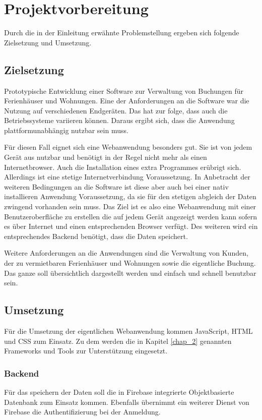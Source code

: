 \chapter{Projektvorbereitung}
Durch die in der Einleitung erwähnte Problemstellung ergeben sich folgende Zielsetzung und Umsetzung.
\section{Zielsetzung}
Prototypische Entwicklung einer Software zur Verwaltung von Buchungen für Ferienhäuser und Wohnungen. Eine der Anforderungen an die Software war die Nutzung auf verschiedenen Endgeräten. Das hat zur folge, dass auch die Betriebssysteme variieren können. Daraus ergibt sich, dass die Anwendung plattformunabhängig nutzbar sein muss. 

Für diesen Fall eignet sich eine Webanwendung besonders gut. Sie ist von jedem Gerät aus nutzbar und benötigt in der Regel nicht mehr als einen Internetbrowser. Auch die Installation eines extra Programmes erübrigt sich. Allerdings ist eine stetige Internetverbindung Voraussetzung. In Anbetracht der weiteren Bedingungen an die Software ist diese aber auch bei einer nativ installieren Anwendung Voraussetzung, da sie für den stetigen abgleich der Daten zwingend vorhanden sein muss. Das Ziel ist es also eine Webanwendung mit einer Benutzeroberfläche zu erstellen die auf jedem Gerät angezeigt werden kann sofern es über Internet und einen entsprechenden Browser verfügt. Des weiteren wird ein entsprechendes Backend benötigt, dass die Daten speichert.

Weitere Anforderungen an die Anwendungen sind die Verwaltung von Kunden, der zu vermietbaren Ferienhäuser und Wohnungen sowie die eigentliche Buchung. Das ganze soll übersichtlich dargestellt werden und einfach und schnell benutzbar sein.


\section{Umsetzung}

Für die Umsetzung der eigentlichen Webanwendung kommen JavaScript, HTML und CSS zum Einsatz. Zu dem werden die in Kapitel \ref{chap_2} genannten Frameworks und Tools zur Unterstützung eingesetzt. 
\subsection{Backend}
Für das speichern der Daten soll die in Firebase integrierte Objektbasierte Datenbank zum Einsatz kommen. Ebenfalls übernimmt ein weiterer Dienst von Firebase die Authentifizierung bei der Anmeldung.

